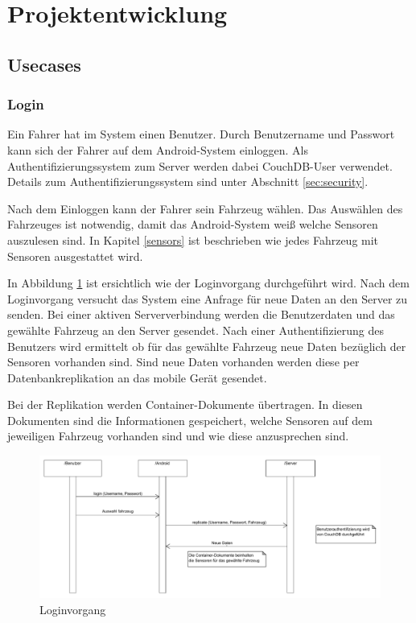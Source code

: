 \section{Projektentwicklung}
\label{sec:development}

\subsection{Usecases}

\subsubsection{Login}

Ein Fahrer hat im System einen Benutzer. Durch Benutzername und Passwort kann sich der Fahrer auf dem Android-System einloggen. Als Authentifizierungssystem zum Server werden dabei CouchDB-User verwendet. Details zum Authentifizierungssystem sind unter Abschnitt \ref{sec:security}.

Nach dem Einloggen kann der Fahrer sein Fahrzeug wählen. Das Auswählen des Fahrzeuges ist notwendig, damit das Android-System weiß welche Sensoren auszulesen sind. In Kapitel \ref{sensors} ist beschrieben wie jedes Fahrzeug mit Sensoren ausgestattet wird. 

In Abbildung \ref{fig:login} ist ersichtlich wie der Loginvorgang durchgeführt wird. Nach dem Loginvorgang versucht das System eine Anfrage für neue Daten an den Server zu senden.  Bei einer aktiven Serververbindung werden die Benutzerdaten und das gewählte Fahrzeug an den Server gesendet. Nach einer Authentifizierung des Benutzers wird ermittelt ob für das gewählte Fahrzeug neue Daten bezüglich der Sensoren vorhanden sind. Sind neue Daten vorhanden werden diese per Datenbankreplikation an das mobile Gerät gesendet.

Bei der Replikation werden Container-Dokumente übertragen. In diesen Dokumenten sind die Informationen gespeichert, welche Sensoren auf dem jeweiligen Fahrzeug vorhanden sind und wie diese anzusprechen sind.

\begin{figure}
	\centering
		\includegraphics[width=\textwidth]{files/pdf/Login.pdf}
	\caption{Loginvorgang}
	\label{fig:login}
\end{figure}


